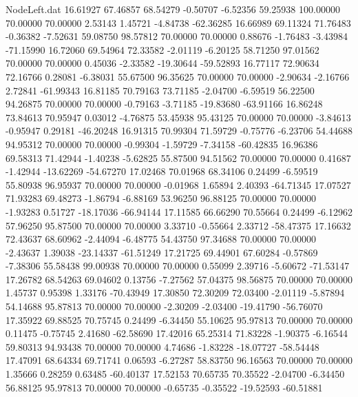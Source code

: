 \begin{filecontents}{NodeLeft.dat}
  16.61927   67.46857   68.54279    -0.50707   -6.52356   59.25938  100.00000   70.00000   70.00000    2.53143    1.45721   -4.84738  -62.36285
  16.66989   69.11324   71.76483    -0.36382   -7.52631   59.08750   98.57812   70.00000   70.00000    0.88676   -1.76483   -3.43984  -71.15990
  16.72060   69.54964   72.33582    -2.01119   -6.20125   58.71250   97.01562   70.00000   70.00000    0.45036   -2.33582  -19.30644  -59.52893
  16.77117   72.90634   72.16766     0.28081   -6.38031   55.67500   96.35625   70.00000   70.00000   -2.90634   -2.16766    2.72841  -61.99343
  16.81185   70.79163   73.71185    -2.04700   -6.59519   56.22500   94.26875   70.00000   70.00000   -0.79163   -3.71185  -19.83680  -63.91166
  16.86248   73.84613   70.95947     0.03012   -4.76875   53.45938   95.43125   70.00000   70.00000   -3.84613   -0.95947    0.29181  -46.20248
  16.91315   70.99304   71.59729    -0.75776   -6.23706   54.44688   94.95312   70.00000   70.00000   -0.99304   -1.59729   -7.34158  -60.42835
  16.96386   69.58313   71.42944    -1.40238   -5.62825   55.87500   94.51562   70.00000   70.00000    0.41687   -1.42944  -13.62269  -54.67270
  17.02468   70.01968   68.34106     0.24499   -6.59519   55.80938   96.95937   70.00000   70.00000   -0.01968    1.65894    2.40393  -64.71345
  17.07527   71.93283   69.48273    -1.86794   -6.88169   53.96250   96.88125   70.00000   70.00000   -1.93283    0.51727  -18.17036  -66.94144
  17.11585   66.66290   70.55664     0.24499   -6.12962   57.96250   95.87500   70.00000   70.00000    3.33710   -0.55664    2.33712  -58.47375
  17.16632   72.43637   68.60962    -2.44094   -6.48775   54.43750   97.34688   70.00000   70.00000   -2.43637    1.39038  -23.14337  -61.51249
  17.21725   69.44901   67.60284    -0.57869   -7.38306   55.58438   99.00938   70.00000   70.00000    0.55099    2.39716   -5.60672  -71.53147
  17.26782   68.54263   69.04602     0.13756   -7.27562   57.04375   98.56875   70.00000   70.00000    1.45737    0.95398    1.33176  -70.43949
  17.30850   72.30209   72.03400    -2.01119   -5.87894   54.14688   95.87813   70.00000   70.00000   -2.30209   -2.03400  -19.41790  -56.76070
  17.35922   69.88525   70.75745     0.24499   -6.34450   55.10625   95.97813   70.00000   70.00000    0.11475   -0.75745    2.41680  -62.58690
  17.42016   65.25314   71.83228    -1.90375   -6.16544   59.80313   94.93438   70.00000   70.00000    4.74686   -1.83228  -18.07727  -58.54448
  17.47091   68.64334   69.71741     0.06593   -6.27287   58.83750   96.16563   70.00000   70.00000    1.35666    0.28259    0.63485  -60.40137
  17.52153   70.65735   70.35522    -2.04700   -6.34450   56.88125   95.97813   70.00000   70.00000   -0.65735   -0.35522  -19.52593  -60.51881

\end{filecontents}
